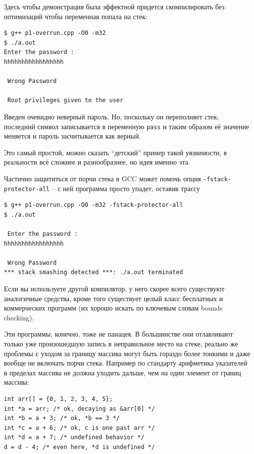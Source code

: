 \documentclass[a4paper,12pt,oneside]{article}
\begin{document}
Здесь чтобы демонстрация была эффектной придется скомпилировать без оптимизаций чтобы переменная попала на стек:

\begin{verbatim}
$ g++ p1-overrun.cpp -O0 -m32
$ ./a.out
Enter the password : 
hhhhhhhhhhhhhhhhh

 Wrong Password 

 Root privileges given to the user 
\end{verbatim}

Введен очевидно неверный пароль. Но, поскольку он переполняет стек, последний символ записывается в переменную \lstinline!pass! и таким образом её значение меняется и пароль засчитывается как верный.

Это самый простой, можно сказать ``детский'' пример такой уязвимости, в реальности всё сложнее и разнообразнее, но идея именно эта.

Частично защититься от порчи стека в GCC может помочь опция \lstinline!-fstack-protector-all! -- с ней программа просто упадет, оставив трассу

\begin{verbatim}
$ g++ p1-overrun.cpp -O0 -m32 -fstack-protector-all
$ ./a.out 

 Enter the password : 
hhhhhhhhhhhhhhhhh

 Wrong Password 
*** stack smashing detected ***: ./a.out terminated
\end{verbatim}

Если вы используете другой компилятор, у него скорее всего существуют аналогичные средства, кроме того существует целый класс бесплатных и коммерческих программ (их хорошо искать по ключевым словам bounds checking).

Эти программы, конечно, тоже не панацея. В большинстве они отлавливают только уже произошедшую запись в неправильное место на стеке, реально же проблемы с уходом за границу массива могут быть гораздо более тонкими и даже вообще не включать порчи стека. Например по стандарту арифметика указателей в пределах массива не должна уходить дальше, чем на один элемент от границ массива:

\begin{lstlisting}
int arr[] = {0, 1, 2, 3, 4, 5};
int *a = arr; /* ok, decaying as &arr[0] */
int *b = a + 3; /* ok, *b == 3 */
int *c = a + 6; /* ok, c is one past arr */
int *d = a + 7; /* undefined behavior */
d = d - 4; /* even here, *d is undefined */
\end{lstlisting}
\end{document}
